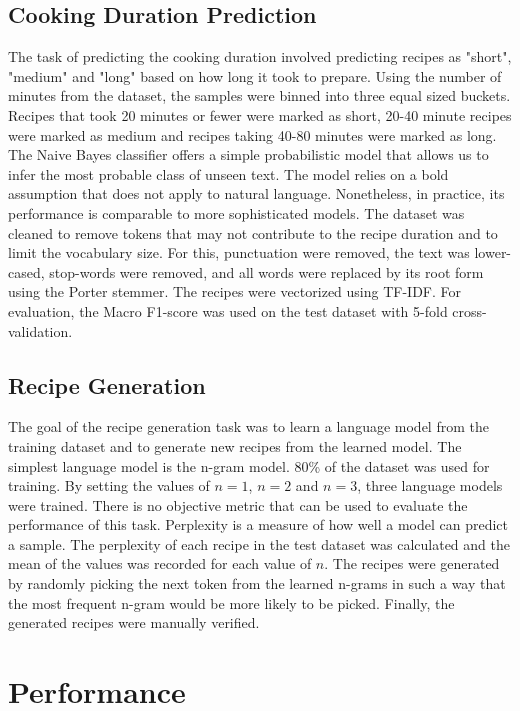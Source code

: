 \documentclass[sigconf]{acmart}
\begin{document}
\subsection{Cooking Duration Prediction}
The task of predicting the cooking duration involved predicting recipes as "short", "medium" and "long" based on how long it took to prepare. Using the number of minutes from the dataset, the samples were binned into three equal sized buckets. Recipes that took 20 minutes or fewer were marked as short, 20-40 minute recipes were marked as medium and recipes taking 40-80 minutes were marked as long. The Naive Bayes classifier offers a simple probabilistic model that allows us to infer the most probable class of unseen text. The model relies on a bold assumption that does not apply to natural language. Nonetheless, in practice, its performance is comparable to more sophisticated models.\cite{CDPNaiveBayes} The dataset was cleaned to remove tokens that may not contribute to the recipe duration and to limit the vocabulary size. For this, punctuation were removed, the text was lower-cased, stop-words were removed, and all words were replaced by its root form using the Porter stemmer.\cite{Porter1980AnAF} The recipes were vectorized using TF-IDF. For evaluation, the Macro F1-score was used on the test dataset with 5-fold cross-validation.

\subsection{Recipe Generation}
The goal of the recipe generation task was to learn a language model from the training dataset and to generate new recipes from the learned model. The simplest language model is the n-gram model. 80\% of the dataset was used for training. By setting the values of $n = 1$, $n = 2$ and $n = 3$, three language models were trained. There is no objective metric that can be used to evaluate the performance of this task. Perplexity is a measure of how well a model can predict a sample. The perplexity of each recipe in the test dataset was calculated and the mean of the values was recorded for each value of $n$. The recipes were generated by randomly picking the next token from the learned n-grams in such a way that the most frequent n-gram would be more likely to be picked. Finally, the generated recipes were manually verified. 

\section{Performance}
\end{document}
